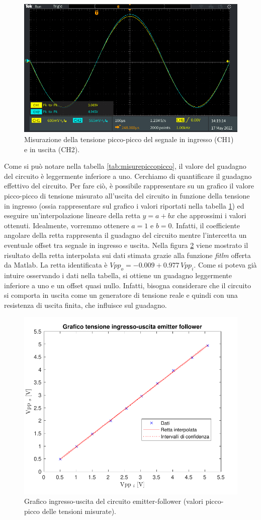 \begin{figure}[h!]
	\centering
	\includegraphics[width=0.7\linewidth]{./ImageFiles/Laboratorio 2/TEK00012}
	\caption{Misurazione della tensione picco-picco del segnale in ingresso (CH1) e in uscita (CH2).}
	\label{fig:emitterfollwer_misurepiccopicco}
\end{figure}

\noindent
Come si può notare nella tabella \ref{tab:misurepiccopicco}, il valore del guadagno del circuito è leggermente inferiore a uno. Cerchiamo di quantificare il guadagno effettivo del circuito. Per fare ciò, è possibile rappresentare su un grafico il valore picco-picco di tensione misurato all'uscita del circuito in funzione della tensione in ingresso (ossia rappresentare sul grafico i valori riportati nella tabella \ref{fig:emitterfollwer_misurepiccopicco}) ed eseguire un'interpolazione lineare della retta $y=a+bx$ che approssimi i valori ottenuti. Idealmente, vorremmo ottenere $a=1$ e $b=0$. Infatti, il coefficiente angolare della retta rappresenta il guadagno del circuito mentre l'intercetta un eventuale offset tra segnale in ingresso e uscita. Nella figura \ref{fig:emitterfollwer_inout} viene mostrato il risultato della retta interpolata sui dati stimata grazie alla funzione \textit{fitlm} offerta da Matlab. La retta identificata è $Vpp_o=-0.009+0.977\,Vpp_i$. Come si poteva già intuire osservando i dati nella tabella, si ottiene un guadagno leggermente inferiore a uno e un offset quasi nullo. Infatti, bisogna considerare che il circuito si comporta in uscita come un generatore di tensione reale e quindi con una resistenza di uscita finita, che influisce sul guadagno.
\begin{figure}[h!]
	\centering
	\includegraphics[width=0.7\linewidth]{./OtherFiles/Laboratorio 2/emitter follower-ingresso_uscita}
	\caption{Grafico ingresso-uscita del circuito emitter-follower (valori picco-picco delle tensioni misurate).}
	\label{fig:emitterfollwer_inout}
\end{figure}

